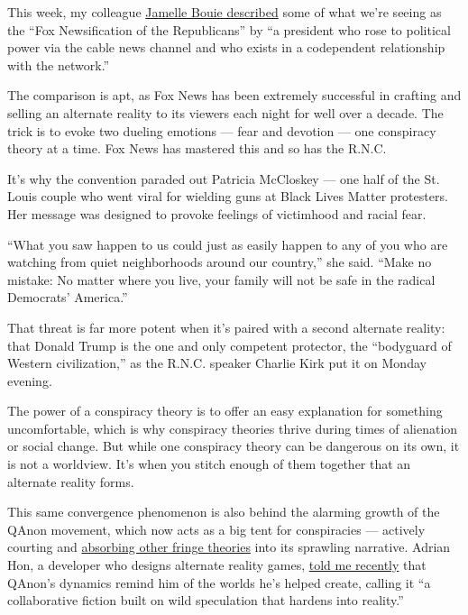 This week, my colleague
\href{https://www.nytimes3xbfgragh.onion/2020/08/25/opinion/trump-convention-platform.html}{Jamelle
Bouie described} some of what we're seeing as the ``Fox Newsification of
the Republicans'' by ``a president who rose to political power via the
cable news channel and who exists in a codependent relationship with the
network.''

The comparison is apt, as Fox News has been extremely successful in
crafting and selling an alternate reality to its viewers each night for
well over a decade. The trick is to evoke two dueling emotions --- fear
and devotion --- one conspiracy theory at a time. Fox News has mastered
this and so has the R.N.C.

It's why the convention paraded out Patricia McCloskey --- one half of
the St. Louis couple who went viral for wielding guns at Black Lives
Matter protesters. Her message was designed to provoke feelings of
victimhood and racial fear.

``What you saw happen to us could just as easily happen to any of you
who are watching from quiet neighborhoods around our country,'' she
said. ``Make no mistake: No matter where you live, your family will not
be safe in the radical Democrats' America.''

That threat is far more potent when it's paired with a second alternate
reality: that Donald Trump is the one and only competent protector, the
``bodyguard of Western civilization,'' as the R.N.C. speaker Charlie
Kirk put it on Monday evening.

The power of a conspiracy theory is to offer an easy explanation for
something uncomfortable, which is why conspiracy theories thrive during
times of alienation or social change. But while one conspiracy theory
can be dangerous on its own, it is not a worldview. It's when you stitch
enough of them together that an alternate reality forms.

This same convergence phenomenon is also behind the alarming growth of
the QAnon movement, which now acts as a big tent for conspiracies ---
actively courting and
\href{https://www.vice.com/en_us/article/v7gz53/the-conspiracy-singularity-has-arrived}{absorbing
other fringe theories} into its sprawling narrative. Adrian Hon, a
developer who designs alternate reality games,
\href{https://www.nytimes3xbfgragh.onion/2020/08/04/opinion/qanon-conspiracy-theory-arg.html}{told
me recently} that QAnon's dynamics remind him of the worlds he's helped
create, calling it ``a collaborative fiction built on wild speculation
that hardens into reality.''

